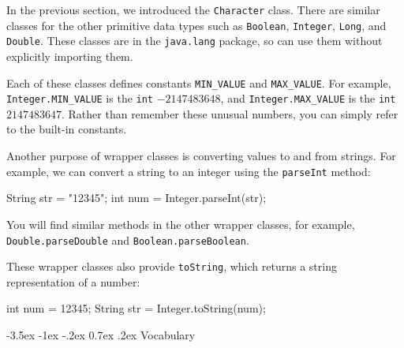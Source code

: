 \documentclass[12pt]{book}
\makeatletter
\theoremstyle{exercise}
\newcommand{\java}[1]{\verb"#1"}
\renewcommand{\section}{\@startsection {section}{1}{\z@}%
    {-3.5ex \@plus -1ex \@minus -.2ex}%
    {0.7ex \@plus.2ex}%
    {\normalfont\Large\bfseries}}
\newcommand{\java}[1]{\lstinline{#1}} %
\makeatother
\begin{document}
In the previous section, we introduced the \java{Character} class.
There are similar classes for the other primitive data types such as \java{Boolean}, \java{Integer}, \java{Long}, and \java{Double}.
These classes are in the \java{java.lang} package, so can use them without explicitly importing them.

Each of these classes defines constants \java{MIN_VALUE} and \java{MAX_VALUE}.
For example, \java{Integer.MIN_VALUE} is the \java{int} $-2147483648$, and \java{Integer.MAX_VALUE} is the \java{int} $2147483647$.
Rather than remember these unusual numbers, you can simply refer to the built-in constants.

Another purpose of wrapper classes is converting values to and from strings.
For example, we can convert a string to an integer using the \java{parseInt} method:

\begin{code}
String str = "12345";
int num = Integer.parseInt(str);
\end{code}

You will find similar methods in the other wrapper classes, for example, \java{Double.parseDouble} and \java{Boolean.parseBoolean}.

These wrapper classes also provide \java{toString}, which returns a string
representation of a number:

\begin{code}
int num = 12345;
String str = Integer.toString(num);
\end{code}






\section{Vocabulary}
\end{document}
